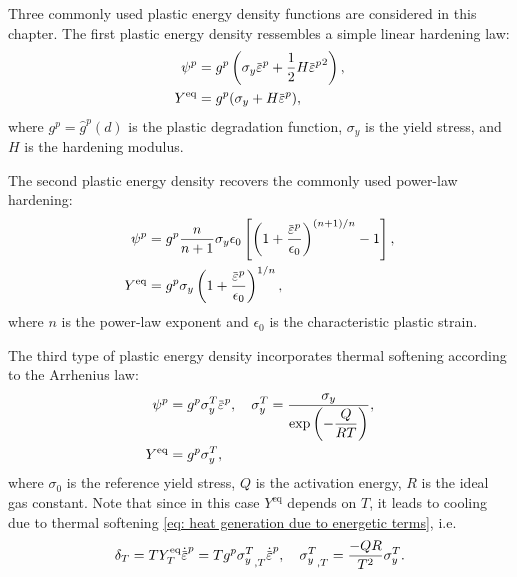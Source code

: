 Three commonly used plastic energy density functions are considered in this chapter. The first plastic energy density ressembles a simple linear hardening law:
\begin{subequations}
  \begin{align}
    \psi^p      & = g^p \left( \sigma_y \ep + \dfrac{1}{2} H \ep^2 \right), \\
    Y^\text{eq} & = g^p (\sigma_y + H \ep),                                 
  \end{align}
\end{subequations}
where $g^p = \hat{g}^p(d)$ is the plastic degradation function, $\sigma_y$ is the yield stress, and $H$ is the hardening modulus.

The second plastic energy density recovers the commonly used power-law hardening:
\begin{subequations}
  \begin{align}
    \psi^p      & = g^p \dfrac{n}{n+1} \sigma_y \epsilon_0 \left[ \left( 1 + \dfrac{\ep}{\epsilon_0} \right)^{(n+1)/n} - 1 \right], \\
    Y^\text{eq} & = g^p \sigma_y \left( 1 + \dfrac{\ep}{\epsilon_0} \right)^{1/n},                                                  
  \end{align}
\end{subequations}
where $n$ is the power-law exponent and $\epsilon_0$ is the characteristic plastic strain.

The third type of plastic energy density incorporates thermal softening according to the Arrhenius law:
\begin{subequations}
  \begin{align}
    \psi^p      & = g^p \sigma_y^T \ep, \quad \sigma_y^T = \dfrac{\sigma_y}{\exp\left( -\dfrac{Q}{RT} \right)}, \label{eq: temperature dependent flow stress} \\
    Y^\text{eq} & = g^p \sigma_y^T,                                                                                                                           
  \end{align}
\end{subequations}
where $\sigma_0$ is the reference yield stress, $Q$ is the activation energy, $R$ is the ideal gas constant. Note that since in this case $Y^\text{eq}$ depends on $T$, it leads to cooling due to thermal softening \eqref{eq: heat generation due to energetic terms}, i.e.
\begin{align}
  \delta_T = TY^\text{eq}_T\epdot = T g^p {\sigma_y^T}_{,T}\epdot, \quad {\sigma_y^T}_{,T} = \dfrac{-QR}{T^2} \sigma_y^T.
\end{align}

